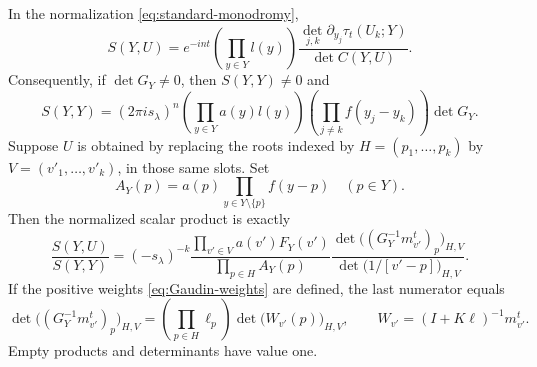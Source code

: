 \begin{lemma}
\label{lem:scalar-product}
In the normalization \eqref{eq:standard-monodromy},
\begin{equation}\label{eq:Slavnov-exact}
 S(Y,U)=e^{-int}\left(\prod_{y\in Y}l(y)\right)
 \frac{\det_{j,k}\partial_{y_j}\tau_t(U_k;Y)}
      {\det C(Y,U)}.
\end{equation}
Consequently, if $\det G_Y\ne0$, then $S(Y,Y)\ne0$ and
\begin{equation}\label{eq:Gaudin-norm-exact}
 S(Y,Y)=(2\pi i s_\lambda)^n
       \left(\prod_{y\in Y}a(y)l(y)\right)
       \left(\prod_{j\ne k}f(y_j-y_k)\right)\det G_Y.
\end{equation}
Suppose $U$ is obtained by replacing the roots indexed by
$H=(p_1,\ldots,p_k)$ by $V=(v'_1,\ldots,v'_k)$, in those same slots.
Set
\[
 A_Y(p)=a(p)\prod_{y\in Y\setminus\{p\}}f(y-p)\quad(p\in Y).
\]
Then the normalized scalar product is exactly
\begin{equation}\label{eq:deleted-scalar-product}
 \frac{S(Y,U)}{S(Y,Y)}
 =(-s_\lambda)^{-k}
   \frac{\prod_{v'\in V}a(v')F_Y(v')}{\prod_{p\in H}A_Y(p)}
   \frac{\det\bigl((G_Y^{-1}m_{v'}^t)_p\bigr)_{H,V}}
        {\det\bigl(1/[v'-p]\bigr)_{H,V}}.
\end{equation}
If the positive weights \eqref{eq:Gaudin-weights} are defined, the
last numerator equals
\begin{equation}\label{eq:W-determinant}
 \det\bigl((G_Y^{-1}m_{v'}^t)_p\bigr)_{H,V}
 =\left(\prod_{p\in H}\ell_p\right)
       \det\bigl(W_{v'}(p)\bigr)_{H,V},
 \qquad W_{v'}=(I+K\ell)^{-1}m_{v'}^t.
\end{equation}
Empty products and determinants have value one.
\end{lemma}

